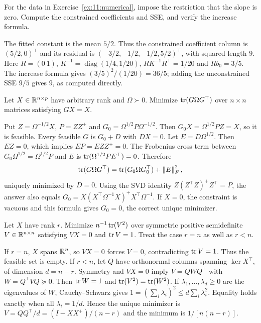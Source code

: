 \begin{problem}
For the data in Exercise~\ref{ex:11:numerical}, impose the restriction
that the slope is zero. Compute the constrained coefficients and SSE,
and verify the increase formula.
\end{problem}
\begin{solution}
The fitted constant is the mean $5/2$. Thus the constrained coefficient
column is $(5/2,0)^\top$ and its residual is
$(-3/2,-1/2,-1/2,5/2)^\top$, with squared length $9$.
Here $R=(0\ 1)$, $K^{-1}=\operatorname{diag}(1/4,1/20)$,
$RK^{-1}R^\top=1/20$ and $Rb_0=3/5$.
The increase formula gives $(3/5)^2/(1/20)=36/5$; adding the unconstrained
SSE $9/5$ gives $9$, as computed directly.
\end{solution}

\begin{problem}
Let $X\in\mathbb R^{n\times p}$ have arbitrary rank and $\Omega\succ0$.
Minimize $\operatorname{tr}(G\Omega G^\top)$ over $n\times n$ matrices satisfying
$GX=X$.
\end{problem}
\begin{solution}
Put $Z=\Omega^{-1/2}X$, $P=ZZ^+$ and
$G_0=\Omega^{1/2}P\Omega^{-1/2}$.
Then $G_0X=\Omega^{1/2}PZ=X$, so it is feasible.
Every feasible $G$ is $G_0+D$ with $DX=0$.
Let $E=D\Omega^{1/2}$. Then $EZ=0$, which implies $EP=EZZ^+=0$.
The Frobenius cross term between
$G_0\Omega^{1/2}=\Omega^{1/2}P$ and $E$ is
$\operatorname{tr}(\Omega^{1/2}PE^\top)=0$. Therefore
\[
\operatorname{tr}(G\Omega G^\top)=\operatorname{tr}(G_0\Omega G_0^\top)+\left\lVert E\right\rVert_F^2,
\]
uniquely minimized by $D=0$. Using the SVD identity
$Z(Z^\top Z)^+Z^\top=P$, the answer also equals
$G_0=X(X^\top\Omega^{-1}X)^+X^\top\Omega^{-1}$.
If $X=0$, the constraint is vacuous and this formula gives $G_0=0$,
the correct unique minimizer.
\end{solution}

\begin{problem}\label{ex:11:quadratic-min}
Let $X$ have rank $r$. Minimize $n^{-1}\operatorname{tr}(V^2)$ over symmetric positive
semidefinite $V\in\mathbb R^{n\times n}$ satisfying $VX=0$ and $\operatorname{tr} V=1$.
Treat the case $r=n$ as well as $r<n$.
\end{problem}
\begin{solution}
If $r=n$, $X$ spans $\mathbb R^n$, so $VX=0$ forces $V=0$, contradicting
$\operatorname{tr} V=1$. Thus the feasible set is empty.
If $r<n$, let $Q$ have orthonormal columns spanning $\ker X^\top$,
of dimension $d=n-r$. Symmetry and $VX=0$ imply
$V=QWQ^\top$ with $W=Q^\top VQ\succeq0$.
Then $\operatorname{tr} W=1$ and $\operatorname{tr}(V^2)=\operatorname{tr}(W^2)$.
If $\lambda_1,\ldots,\lambda_d\geqslant0$ are the eigenvalues of $W$,
Cauchy--Schwarz gives $1=(\sum_i\lambda_i)^2\leqslant d\sum_i\lambda_i^2$.
Equality holds exactly when all $\lambda_i=1/d$.
Hence the unique minimizer is
$V=QQ^\top/d=(I-XX^+)/(n-r)$ and the minimum is $1/[n(n-r)]$.
\end{solution}

